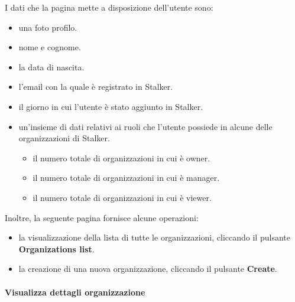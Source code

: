 \documentclass[../manuale-utente.tex]{subfiles}
\begin{document}
I dati che la pagina mette a disposizione dell'utente sono:
\begin{itemize}
    \item una foto profilo.
    \item nome e cognome.
    \item la data di nascita.
    \item l'email con la quale è registrato in Stalker.
    \item il giorno in cui l'utente è stato aggiunto in Stalker.
    \item un'insieme di dati relativi ai ruoli che l'utente possiede in alcune delle organizzazioni di Stalker.
    \begin{itemize}
        \item il numero totale di organizzazioni in cui è owner.
        \item il numero totale di organizzazioni in cui è manager.
        \item il numero totale di organizzazioni in cui è viewer.
    \end{itemize}
\end{itemize}

Inoltre, la seguente pagina fornisce alcune operazioni:
\begin{itemize}
    \item la visualizzazione della lista di tutte le organizzazioni, cliccando il pulsante \textbf{Organizations list}. %
    \item la creazione di una nuova organizzazione, cliccando il pulsante \textbf{Create}. %
\end{itemize}
\newpage




\paragraph{Visualizza dettagli organizzazione}%
\label{par:visualizza_dettagli_organizzazione}
\end{document}

